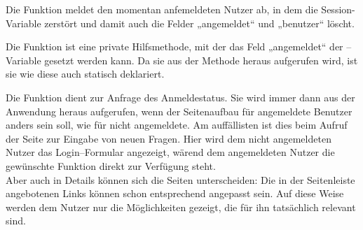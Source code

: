 Die Funktion  meldet den momentan anfemeldeten Nutzer ab, in dem die Session-Variable zerstört und damit auch die Felder „angemeldet“ und „benutzer“ löscht.

Die Funktion  ist eine private Hilfsmethode, mit der das Feld „angemeldet“ der --Variable gesetzt werden kann. Da sie aus der Methode  heraus aufgerufen wird, ist sie wie diese auch statisch deklariert.

Die Funktion  dient zur Anfrage des Anmeldestatus. Sie wird immer dann aus der Anwendung heraus aufgerufen, wenn der Seitenaufbau für angemeldete Benutzer anders sein soll, wie für nicht angemeldete. Am auffällisten ist dies beim Aufruf der Seite zur Eingabe von neuen Fragen. Hier wird dem nicht angemeldeten Nutzer das Login--Formular angezeigt, wärend dem angemeldeten Nutzer die gewünschte Funktion direkt zur Verfügung steht.\\
Aber auch in Details können sich die Seiten unterscheiden: Die in der Seitenleiste angebotenen Links können schon entsprechend angepasst sein. Auf diese Weise werden dem Nutzer nur die Möglichkeiten gezeigt, die für ihn tatsächlich relevant sind. 
